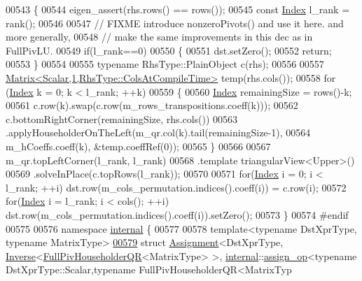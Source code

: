 \begin{DoxyCode}
00543 \textcolor{keyword}{}\{
00544   eigen\_assert(rhs.rows() == rows());
00545   \textcolor{keyword}{const} \hyperlink{namespace_eigen_a62e77e0933482dafde8fe197d9a2cfde}{Index} l\_rank = rank();
00546 
00547   \textcolor{comment}{// FIXME introduce nonzeroPivots() and use it here. and more generally,}
00548   \textcolor{comment}{// make the same improvements in this dec as in FullPivLU.}
00549   \textcolor{keywordflow}{if}(l\_rank==0)
00550   \{
00551     dst.setZero();
00552     \textcolor{keywordflow}{return};
00553   \}
00554 
00555   \textcolor{keyword}{typename} RhsType::PlainObject c(rhs);
00556 
00557   \hyperlink{group___core___module_class_eigen_1_1_matrix}{Matrix<Scalar,1,RhsType::ColsAtCompileTime>} temp(rhs.cols());
00558   \textcolor{keywordflow}{for} (\hyperlink{namespace_eigen_a62e77e0933482dafde8fe197d9a2cfde}{Index} k = 0; k < l\_rank; ++k)
00559   \{
00560     \hyperlink{namespace_eigen_a62e77e0933482dafde8fe197d9a2cfde}{Index} remainingSize = rows()-k;
00561     c.row(k).swap(c.row(m\_rows\_transpositions.coeff(k)));
00562     c.bottomRightCorner(remainingSize, rhs.cols())
00563       .applyHouseholderOnTheLeft(m\_qr.col(k).tail(remainingSize-1),
00564                                m\_hCoeffs.coeff(k), &temp.coeffRef(0));
00565   \}
00566 
00567   m\_qr.topLeftCorner(l\_rank, l\_rank)
00568       .template triangularView<Upper>()
00569       .solveInPlace(c.topRows(l\_rank));
00570 
00571   \textcolor{keywordflow}{for}(\hyperlink{namespace_eigen_a62e77e0933482dafde8fe197d9a2cfde}{Index} i = 0; i < l\_rank; ++i) dst.row(m\_cols\_permutation.indices().coeff(i)) = c.row(i);
00572   \textcolor{keywordflow}{for}(\hyperlink{namespace_eigen_a62e77e0933482dafde8fe197d9a2cfde}{Index} i = l\_rank; i < cols(); ++i) dst.row(m\_cols\_permutation.indices().coeff(i)).setZero();
00573 \}
00574 \textcolor{preprocessor}{#endif}
00575 
00576 \textcolor{keyword}{namespace }\hyperlink{namespaceinternal}{internal} \{
00577   
00578 \textcolor{keyword}{template}<\textcolor{keyword}{typename} DstXprType, \textcolor{keyword}{typename} MatrixType>
\hyperlink{struct_eigen_1_1internal_1_1_assignment_3_01_dst_xpr_type_00_01_inverse_3_01_full_piv_householde4c13323440da58b97e1a51d313048bfd}{00579} \textcolor{keyword}{struct }\hyperlink{struct_eigen_1_1internal_1_1_assignment}{Assignment}<DstXprType, \hyperlink{class_eigen_1_1_inverse}{Inverse}<\hyperlink{group___q_r___module_class_eigen_1_1_full_piv_householder_q_r}{FullPivHouseholderQR}<MatrixType>
       >, \hyperlink{namespaceinternal}{internal}::\hyperlink{struct_eigen_1_1internal_1_1assign__op}{assign\_op}<typename DstXprType::Scalar,typename FullPivHouseholderQR<MatrixTyp

\end{DoxyCode}
